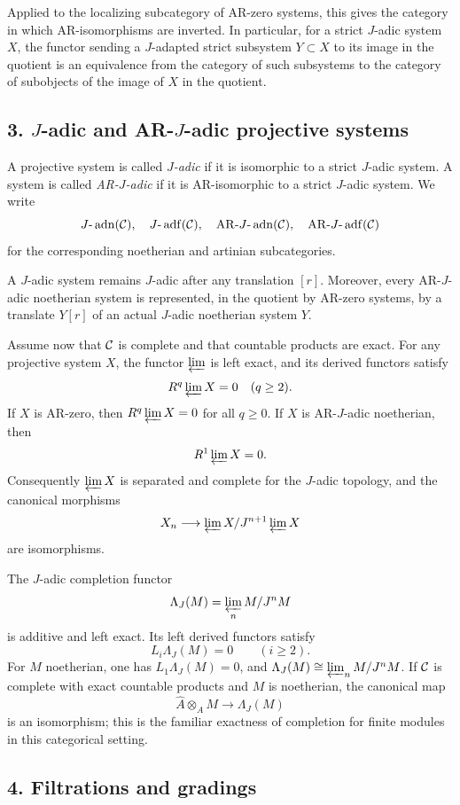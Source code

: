 \documentclass[11pt]{article}
\theoremstyle{plain}
\theoremstyle{definition}
\theoremstyle{remark}
\newcommand{\AR}{\mathrm{AR}}
\providecommand{\adn}{\operatorname{adn}}
\providecommand{\adf}{\operatorname{adf}}
\begin{document}
Applied to the localizing subcategory of AR-zero systems, this gives the category in
which AR-isomorphisms are inverted. In particular, for a strict $J$-adic system $X$,
the functor sending a $J$-adapted strict subsystem $Y\subset X$ to its image in the
quotient is an equivalence from the category of such subsystems to the category of
subobjects of the image of $X$ in the quotient.

\subsection*{3. $J$-adic and AR-$J$-adic projective systems}

A projective system is called \emph{$J$-adic} if it is isomorphic to a strict
$J$-adic system. A system is called \emph{AR-$J$-adic} if it is AR-isomorphic to a
strict $J$-adic system. We write
\[
J\text{-}\adn(\cC),\quad J\text{-}\adf(\cC),\quad
\AR\text{-}J\text{-}\adn(\cC),\quad \AR\text{-}J\text{-}\adf(\cC)
\]
for the corresponding noetherian and artinian subcategories.

A $J$-adic system remains $J$-adic after any translation $[r]$. Moreover, every
AR-$J$-adic noetherian system is represented, in the quotient by AR-zero systems,
by a translate $Y[r]$ of an actual $J$-adic noetherian system $Y$.

Assume now that $\mathcal C$ is complete and that countable products are exact. For any
projective system $X$, the functor $\varprojlim$ is left exact, and its derived
functors satisfy
\[
       R^q\varprojlim X=0\quad(q\ge2).
\]
If $X$ is AR-zero, then $R^q\varprojlim X=0$ for all $q\ge0$. If $X$ is
AR-$J$-adic noetherian, then
\[
       R^1\varprojlim X=0.
\]
Consequently $\varprojlim X$ is separated and complete for the $J$-adic topology,
and the canonical morphisms
\[
      X_n\longrightarrow \varprojlim X/J^{n+1}\varprojlim X
\]
are isomorphisms.

The $J$-adic completion functor
\[
      \Lambda_J(M)=\varprojlim_n M/J^nM
\]
is additive and left exact. Its left derived functors satisfy
\[
      L_i\Lambda_J(M)=0\qquad(i\ge2).
\]
For $M$ noetherian, one has $L_1\Lambda_J(M)=0$, and
$\Lambda_J(M)\cong\varprojlim_n M/J^nM$. If $\mathcal C$ is complete with exact countable
products and $M$ is noetherian, the canonical map
\[
      \widehat A\otimes_A M\longrightarrow \Lambda_J(M)
\]
is an isomorphism; this is the familiar exactness of completion for finite modules
in this categorical setting.

\subsection*{4. Filtrations and gradings}
\end{document}
